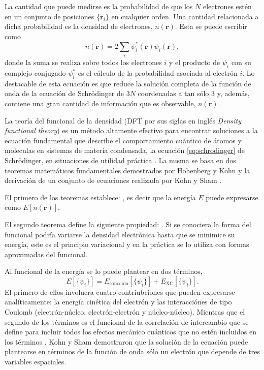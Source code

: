 La cantidad que puede medirse es la probabilidad de que los $N$ electrones 
estén en un conjunto de posiciones $\lbrace \mathbf{r}_i \rbrace$ en cualquier orden. 
Una cantidad relacionada a dicha probabilidad es la densidad de electrones,
$n(\mathbf{r})$. Esta se puede escribir como 
\begin{equation}
    n(\mathbf{r}) = 2 \sum_i \psi_i^*(\mathbf{r}) \psi_i(\mathbf{r}),
\end{equation}
donde la suma se realiza sobre todos los electrones $i$ y el producto de $\psi_i$ con su 
complejo conjugado $\psi_i^*$ es el cálculo de la probabilidad asociada al electrón $i$. 
Lo destacable de esta ecuación es que reduce la solución completa de la función de onda
de la ecuación de Schrödinger de $3 N$ coordenadas a tan sólo 3 y, además, contiene una 
gran cantidad de información que es observable, $n(\mathbf{r})$.

La teoría del funcional de la densidad (DFT por sus siglas en inglés
\textit{Density functional theory}) es un método altamente efectivo para 
encontrar soluciones a la ecuación fundamental que describe el comportamiento 
cuántico de átomos y moleculas en sistemas de materia condensada, la ecuación 
\ref{eq:schrodinger} de Schrödinger, en situaciones de utilidad práctica 
\cite{sholl2022}. La misma se basa en dos teoremas matemáticos fundamentales
demostrados por Hohenberg y Kohn \cite{hohenberg1964} y la derivación de un 
conjunto de ecuaciones realizada por Kohn y Sham \cite{kohn1965}.

El primero de los teoremas establece: , es decir que la energía $E$ puede expresarse como 
$E[n(\mathbf{r})]$.

El segundo teorema define la siguiente propiedad: .
Si se conociera la forma del funcional  podría variarse la 
densidad electrónica hasta que se minimice su energía, este es el principio 
variacional y en la práctica se lo utiliza con formas aproximadas del funcional.

Al funcional de la energía se lo puede plantear en dos términos,
\begin{equation}
    E[\lbrace \psi_i \rbrace] = E_{\text{conocido}}[\lbrace \psi_i \rbrace] + E_{\text{XC}}[\lbrace \psi_i \rbrace].
\end{equation}
El primero de ellos involucra cuatro contriubciones que pueden expresarse 
analíticamente: la energía cinética del electrón y las interacciónes de tipo 
Coulomb (electrón-núcleo, electrón-electrón y núcleo-núcleo). Mientras que
el segundo de los términos es el funcional de la correlación de intercambio
que se define para incluir todos los efectos mecánico cuánticos que no estén
incluidos en los términos . Kohn y Sham demostraron que la 
solución de la ecuación puede plantearse en términos de la función de onda 
sólo un electrón que depende de tres variables espaciales.

